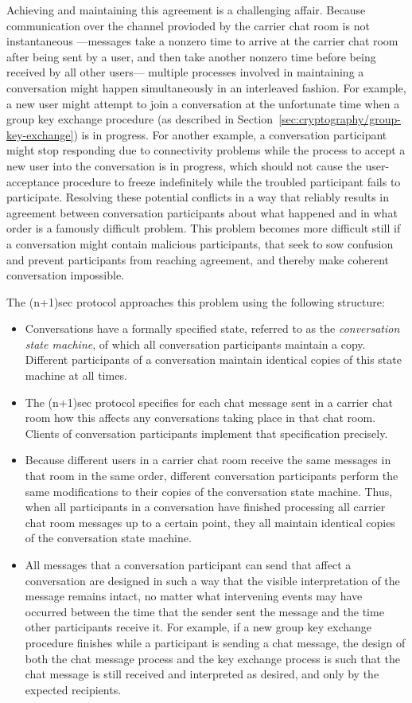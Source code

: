 \documentclass{article}
\begin{document}
Achieving and maintaining this agreement is a challenging affair.
Because communication over the channel provioded by the carrier chat room is not instantaneous ---messages take a nonzero time to arrive at the carrier chat room after being sent by a user, and then take another nonzero time before being received by all other users--- multiple processes involved in maintaining a conversation might happen simultaneously in an interleaved fashion.
For example, a new user might attempt to join a conversation at the unfortunate time when a group key exchange procedure (as described in Section~\ref{sec:cryptography/group-key-exchange}) is in progress.
For another example, a conversation participant might stop responding due to connectivity problems while the process to accept a new user into the conversation is in progress, which should not cause the user-acceptance procedure to freeze indefinitely while the troubled participant fails to participate.
Resolving these potential conflicts in a way that reliably results in agreement between conversation participants about what happened and in what order is a famously difficult problem.
This problem becomes more difficult still if a conversation might contain malicious participants, that seek to sow confusion and prevent participants from reaching agreement, and thereby make coherent conversation impossible.

The (n+1)sec protocol approaches this problem using the following structure:
\begin{itemize}
\item Conversations have a formally specified state, referred to as the \emph{conversation state machine}, of which all conversation participants maintain a copy. Different participants of a conversation maintain identical copies of this state machine at all times.
\item The (n+1)sec protocol specifies for each chat message sent in a carrier chat room how this affects any conversations taking place in that chat room. Clients of conversation participants implement that specification precisely.
\item Because different users in a carrier chat room receive the same messages in that room in the same order, different conversation participants perform the same modifications to their copies of the conversation state machine. Thus, when all participants in a conversation have finished processing all carrier chat room messages up to a certain point, they all maintain identical copies of the conversation state machine.
\item All messages that a conversation participant can send that affect a conversation are designed in such a way that the visible interpretation of the message remains intact, no matter what intervening events may have occurred between the time that the sender sent the message and the time other participants receive it. For example, if a new group key exchange procedure finishes while a participant is sending a chat message, the design of both the chat message process and the key exchange process is such that the chat message is still received and interpreted as desired, and only by the expected recipients.
\end{itemize}
\end{document}

